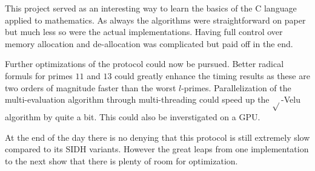 \documentclass[../main.tex]{subfiles}
\begin{document}
This project served as an interesting way to learn the basics of the C language applied to mathematics.
As always the algorithms were straightforward on paper but much less so were the actual implementations.
Having full control over memory allocation and de-allocation was complicated but paid off in the end.

Further optimizations of the protocol could now be pursued.
Better radical formuls for primes $11$ and $13$ could greatly enhance the timing results as these are two orders of magnitude faster than the worst $l$-primes.
Parallelization of the multi-evaluation algorithm through multi-threading could speed up the $\sqrt{}$-Velu algorithm by quite a bit.
This could also be inverstigated on a GPU.

At the end of the day there is no denying that this protocol is still extremely slow compared to its SIDH variants.
However the great leaps from one implementation to the next show that there is plenty of room for optimization.
\end{document}
